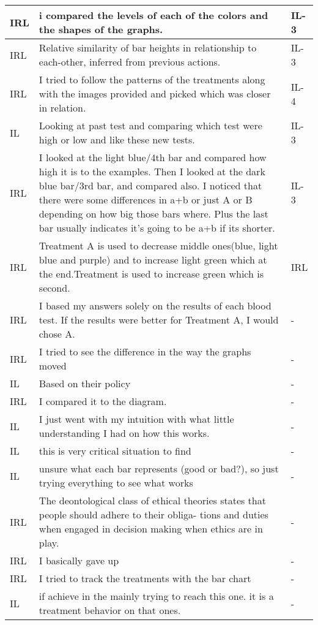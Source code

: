 \documentclass{article}
\begin{document}
\begin{longtable}{ | m{0.6in} | m{5in}| m{0.6in} | }
IRL & i compared the levels of each of the colors  and the shapes of the graphs.  & IL-3 \\ \hline
IRL & Relative similarity of bar heights in relationship to each-other,  inferred from previous actions.   & IL-3 \\ \hline
IRL & I tried to follow the patterns of the treatments along with the images provided and picked which was closer in relation.  & IL-4 \\ \hline
IL & Looking at past test and comparing which test were high or low and like these new tests. & IL-3 \\ \hline
IRL & I looked at the light blue/4th bar and compared how high it is to the examples. Then I looked at the dark blue bar/3rd bar, and compared also. I noticed that there were some differences in a+b or just A or B depending on how big those bars where. Plus the last bar usually indicates it's going to be a+b if its shorter. & IL-3 \\ \hline
IRL & Treatment A is used to decrease middle ones(blue, light blue and purple) and to increase light green which at the end.\n\n Treatment  is used to increase green which is second. & IRL \\ \hline
IRL & I based my answers solely on the results of each blood test. If the results were better for Treatment A, I would chose A.  & - \\ \hline
IRL & I tried to see the difference in the way the graphs moved & - \\ \hline
IL & Based on their policy & - \\ \hline
IRL & I compared it to the diagram. & - \\ \hline
IL & I just went with my intuition with what little understanding I had on how this works. & - \\ \hline
IL & this is very critical situation to find & - \\ \hline
IL & unsure what each bar represents (good or bad?), so just trying everything to see what works & - \\ \hline
IRL & The deontological class of ethical theories states that people should adhere to their obliga- tions and duties when engaged in decision making when ethics are in play. & - \\ \hline
IRL & I basically gave up & - \\ \hline
IRL & I tried to track the treatments with the bar chart & - \\ \hline
IL & if achieve in the mainly trying to reach this one. it is a treatment behavior on that ones. & - \\ \hline

\end{longtable}
\end{document}
